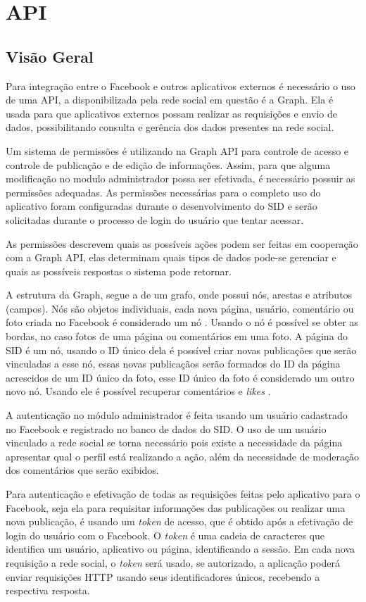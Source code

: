 \chapter[API]{API}

\section{Visão Geral}
Para integração entre o Facebook e outros aplicativos externos é necessário o uso de uma API, a disponibilizada pela rede social em questão é a Graph. Ela é usada para que aplicativos externos possam realizar as requisições e envio de dados, possibilitando consulta e gerência dos dados presentes na rede social. 

Um sistema de permissões é utilizando na Graph API para controle de acesso e controle de publicação e de edição de informações. Assim, para que alguma modificação no modulo administrador possa ser efetivada, é necessário possuir as permissões adequadas. As permissões necessárias para o completo uso do aplicativo foram configuradas durante o desenvolvimento do SID e serão solicitadas durante o processo de login do usuário que tentar acessar.

As permissões descrevem quais as possíveis ações podem ser feitas em cooperação com a Graph API, elas determinam quais tipos de dados pode-se gerenciar e quais as possíveis respostas o sistema pode retornar.

A estrutura da Graph, segue a de um grafo, onde possui nós, arestas e atributos (campos). Nós são objetos individuais, cada nova página, usuário, comentário ou foto criada no Facebook é considerado um nó \cite{facebook2018b}. Usando o nó é possível se obter as bordas, no caso fotos de uma página ou comentários em uma foto. A página do SID é um nó, usando o ID único dela é possível criar novas publicações que serão vinculadas a esse nó, essas novas publicaçãos serão formados do ID da página acrescidos de um ID único da foto, esse ID único da foto é considerado um outro novo nó. Usando ele é possível recuperar comentários e \textit{likes} \cite{facebook2018b}.

A autenticação no módulo administrador é feita usando um usuário cadastrado no Facebook e registrado no banco de dados do SID. O uso de um usuário vinculado a rede social se torna necessário pois existe a necessidade da página apresentar qual o perfil está realizando a ação, além da necessidade de moderação dos comentários que serão exibidos. 

Para autenticação e efetivação de todas as requisições feitas pelo aplicativo para o Facebook, seja ela para requisitar informações das publicações ou realizar uma nova publicação, é usando um \textit{token} de acesso, que é obtido após a efetivação de login do usuário com o Facebook. O \textit{token} é uma cadeia de caracteres que identifica um usuário, aplicativo ou página, identificando a sessão. Em cada nova requisição a rede social, o \textit{token} será usado, se autorizado, a aplicação poderá enviar requisições HTTP usando seus identificadores únicos, recebendo a respectiva resposta.

